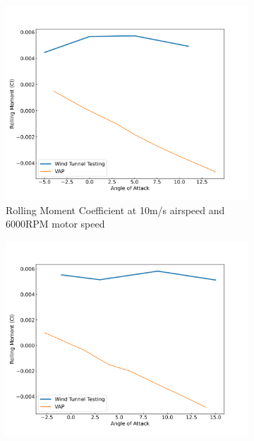 \begin{figure}[H]
    \centering
    \begin{subfigure}[b]{0.467\textwidth}
        \centering
        \includegraphics[width=\textwidth]{05_Results/VAP/noProp/Cl/10ms_6000RPM_Cl.png}
        \caption{Rolling Moment Coefficient at 10m/s airspeed and 6000RPM motor speed}
        \label{fig:VAP_NoProp_Cl_10ms_6000}
    \end{subfigure}
    \begin{subfigure}[b]{0.467\textwidth}
        \centering
        \includegraphics[width=\textwidth]{05_Results/VAP/noProp/Cl/10ms_11000RPM_Cl.png}

\end{subfigure}
\end{figure}
